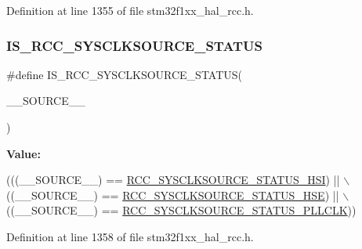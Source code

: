 Definition at line 1355 of file stm32f1xx\+\_\+hal\+\_\+rcc.\+h.

\mbox{\label{group___r_c_c___private___macros_gae09fa77206ca9cb1952b7d0ae49c8f4c}} 
\subsubsection{\texorpdfstring{I\+S\+\_\+\+R\+C\+C\+\_\+\+S\+Y\+S\+C\+L\+K\+S\+O\+U\+R\+C\+E\+\_\+\+S\+T\+A\+T\+US}{IS\_RCC\_SYSCLKSOURCE\_STATUS}}
{\footnotesize\ttfamily \#define I\+S\+\_\+\+R\+C\+C\+\_\+\+S\+Y\+S\+C\+L\+K\+S\+O\+U\+R\+C\+E\+\_\+\+S\+T\+A\+T\+US(\begin{DoxyParamCaption}\item[{}]{\+\_\+\+\_\+\+S\+O\+U\+R\+C\+E\+\_\+\+\_\+ }\end{DoxyParamCaption})}

{\bfseries Value\+:}
\begin{DoxyCode}
(((\_\_SOURCE\_\_) == \hyperlink{group___r_c_c___system___clock___source___status_ga0d6c2b0b2d59e6591295649853bb2abd}{RCC\_SYSCLKSOURCE\_STATUS\_HSI}) || \(\backslash\)
                                                ((\_\_SOURCE\_\_) == 
      \hyperlink{group___r_c_c___system___clock___source___status_ga3847769265bf19becf7b976a7e908a64}{RCC\_SYSCLKSOURCE\_STATUS\_HSE}) || \(\backslash\)
                                                ((\_\_SOURCE\_\_) == 
      \hyperlink{group___r_c_c___system___clock___source___status_ga4f05019ec09da478d084f44dbaad7d6d}{RCC\_SYSCLKSOURCE\_STATUS\_PLLCLK}))
\end{DoxyCode}


Definition at line 1358 of file stm32f1xx\+\_\+hal\+\_\+rcc.\+h.

